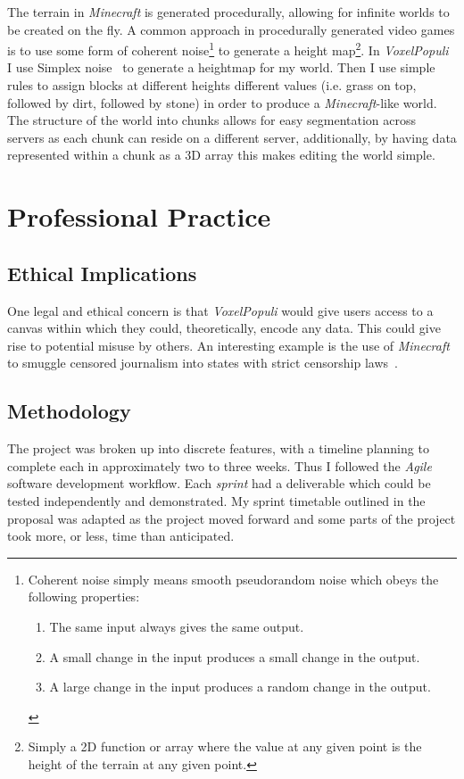 \documentclass[12pt,notitlepage,a4paper]{report}
\newcommand{\voxpop}{\emph{VoxelPopuli}}
\begin{document}
	The terrain in \emph{Minecraft} is generated procedurally, allowing for infinite worlds to be created on the fly. A common approach in procedurally generated video games is to use some form of coherent noise\footnote{Coherent noise simply means smooth pseudorandom noise which obeys the following properties: \begin{enumerate} \item The same input always gives the same output. \item A small change in the input produces a small change in the output. \item A large change in the input produces a random change in the output.\end{enumerate}} to generate a height map\footnote{Simply a 2D function or array where the value at any given point is the height of the terrain at any given point.}. In \voxpop{} I use Simplex noise~\cite{simplex} to generate a heightmap for my world. Then I use simple rules to assign blocks at different heights different values (i.e. grass on top, followed by dirt, followed by stone) in order to produce a \emph{Minecraft}-like world. The structure of the world into chunks allows for easy segmentation across servers as each chunk can reside on a different server, additionally, by having data represented within a chunk as a 3D array this makes editing the world simple.
	
	\section{Professional Practice}
	\subsection{Ethical Implications}
	One legal and ethical concern is that \voxpop{} would give users access to a canvas within which they could, theoretically, encode any data. This could give rise to potential misuse by others. An interesting example is the use of \emph{Minecraft} to smuggle censored journalism into states with strict censorship laws~\cite{verge}.
	
	\subsection{Methodology}
	The project was broken up into discrete features, with a timeline planning to complete each in approximately two to three weeks. Thus I followed the \emph{Agile} software development workflow. Each \emph{sprint} had a deliverable which could be tested independently and demonstrated. My sprint timetable outlined in the proposal was adapted as the project moved forward and some parts of the project took more, or less, time than anticipated.
	
\end{document}
